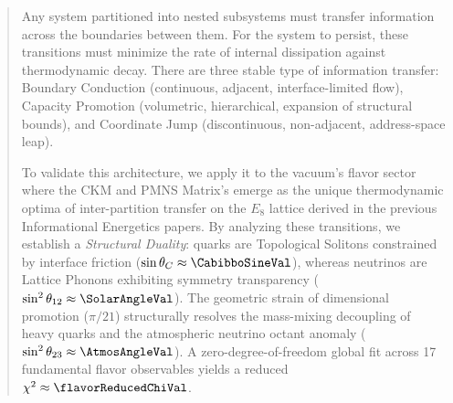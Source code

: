 
\begin{abstract}
Any system partitioned into nested subsystems must transfer information across the boundaries between them. For the system to persist, these transitions must minimize the rate of internal dissipation against thermodynamic decay. There are three stable type of information transfer: Boundary Conduction (continuous, adjacent, interface-limited flow), Capacity Promotion (volumetric, hierarchical, expansion of structural bounds), and Coordinate Jump (discontinuous, non-adjacent, address-space leap).

To validate this architecture, we apply it to the vacuum's flavor sector where the CKM and PMNS Matrix's emerge as the unique thermodynamic optima of inter-partition transfer on the $E_8$ lattice derived in the previous Informational Energetics papers. By analyzing these transitions, we establish a \textit{Structural Duality}: quarks are Topological Solitons constrained by interface friction ($\sin\theta_C \approx \CabibboSineVal$), whereas neutrinos are Lattice Phonons exhibiting symmetry transparency ($\sin^2\theta_{12} \approx \SolarAngleVal$). The geometric strain of dimensional promotion ($\pi/21$) structurally resolves the mass-mixing decoupling of heavy quarks and the atmospheric neutrino octant anomaly ($\sin^2\theta_{23} \approx \AtmosAngleVal$). A zero-degree-of-freedom global fit across 17 fundamental flavor observables yields a reduced $\chi^2 \approx \flavorReducedChiVal$.
\end{abstract}